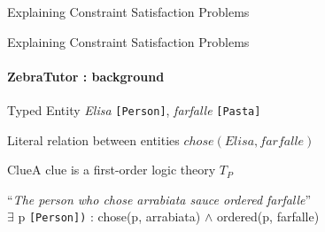 \documentclass{beamer}
\newcommand\m[1]{\ensuremath{#1}\xspace}
\newcommand\allconstraints{\m{T_P}}
\begin{document}
\begin{frame}{\small{Explaining Constraint Satisfaction Problems}}
    \pause
    \pause
    \pause
    \pause

\end{frame}

\begin{frame}{\small{Explaining Constraint Satisfaction Problems}}
    \framesubtitle{ZebraTutor : background}
    \begin{block}{Typed Entity} \textit{Elisa} \texttt{[Person]}, \textit{farfalle} \texttt{[Pasta]}\end{block}
    \vspace{0.5em}
    \begin{block}{Literal} relation between entities $chose(Elisa, farfalle)$\end{block}
    \vspace{0.5em}
    \begin{block}{Clue}A clue is a first-order logic theory $\allconstraints$
    \begin{center}
        ``\emph{The person who chose arrabiata sauce ordered farfalle}''\\
        \vspace{0.5em}
        $\exists$ p \texttt{[Person])} : chose(p, arrabiata) $\wedge$ ordered(p, farfalle)
    \end{center}
\end{block}
    
\end{frame}
\end{document}
